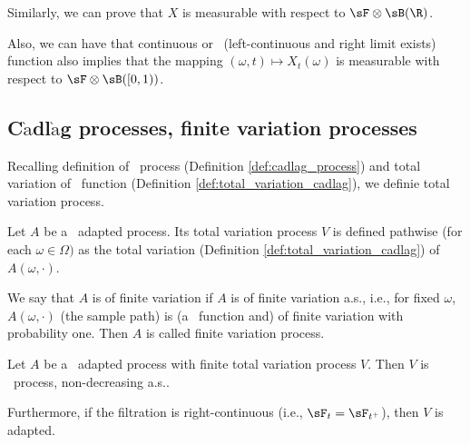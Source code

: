 
\begin{remark}
Similarly, we can prove that $X$ is measurable with respect to $\sF\otimes \sB(\R)$.

Also, we can have that continuous or \ladcag\ (left-continuous and right limit exists) function also implies that the mapping $(\omega, t) \mapsto X_t(\omega)$ is measurable with respect to $\sF\otimes \sB([0, 1))$.
\end{remark}

\subsection{C$\grave{\text{a}}$dl$\grave{\text{a}}$g processes, finite variation processes}

Recalling definition of \cadlag\ process (Definition \ref{def:cadlag_process}) and total variation of \cadlag\ function (Definition \ref{def:total_variation_cadlag}), we definie total variation process.

\begin{definition}\label{def:total_variation_process}
Let $A$ be a \cadlag\ adapted process. Its total variation process $V$ is defined pathwise (for each $\omega \in \Omega)$ as the total variation (Definition \ref{def:total_variation_cadlag}) of $A(\omega, \cdot)$.

We say that $A$ is of finite variation if $A$ is of finite variation a.s., i.e., for fixed $\omega$, $A(\omega, \cdot)$ (the sample path) is (a \cadlag\ function and) of finite variation with probability one. %
Then $A$ is called finite variation process.
\end{definition}


\begin{lemma}\label{lem:cadlag_sample_continuous_process_finite_variation_process}
Let $A$ be a \cadlag\ adapted process with finite total variation process $V$. Then $V$ is \cadlag\ process, non-decreasing a.s..%

Furthermore, if the filtration is right-continuous (i.e., $\sF_t = \sF_{t^+}$), then $V$ is adapted.%
\end{lemma}

